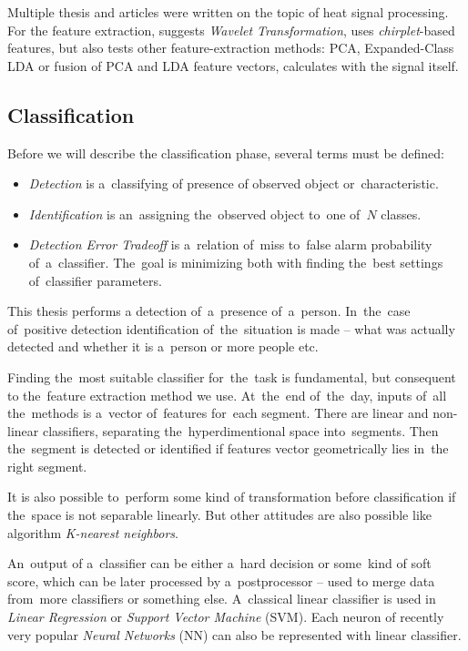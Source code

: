 Multiple thesis and articles were written on the topic of heat signal processing. For the feature extraction,
\cite{SinglePIR} suggests {\it Wavelet Transformation}, \cite{ChirpletSVM} uses {\it chirplet}-based features,
but also tests other feature-extraction methods: PCA, Expanded-Class LDA or fusion of PCA and LDA feature vectors,
\cite{BayesanClassifier} calculates with the signal itself.

\subsection*{Classification}
Before we will describe the classification phase, several terms must be defined: 
\begin{itemize}
\item {\it Detection} is a~classifying of presence of observed object or~characteristic.
\item {\it Identification} is an~assigning the~observed object to~one of~$N$ classes.
\item {\it Detection Error Tradeoff} is a~relation of~miss to~false alarm probability of~a~classifier.
The~goal is minimizing both with finding the~best settings of~classifier parameters.
\end{itemize}
This thesis performs a detection of~a~presence of~a~person. In~the~case of~positive detection identification
of~the~situation is made -- what was actually detected and whether it is a~person or more people etc.

Finding the~most suitable classifier for~the~task is fundamental, but consequent to the~feature extraction
method we use. At~the~end of~the~day, inputs of~all the~methods is a~vector of~features for~each segment.
There are linear and non-linear classifiers, separating the~hyperdimentional space into~segments. Then
the~segment is detected or identified if features vector geometrically lies in~the right segment. 

It is also possible to~perform some kind of transformation before classification if the~space is not separable
linearly. But other attitudes are also possible like algorithm {\it K-nearest neighbors}.

An~output of a~classifier can be either a~hard decision or some~kind of soft score, which can be later processed
by a~postprocessor -- used to merge data from~more classifiers or something else. A~classical linear classifier
is used in {\it Linear Regression} or {\it Support Vector Machine} (SVM). Each neuron of recently very popular
{\it Neural Networks} (NN) can also be represented with linear classifier.

